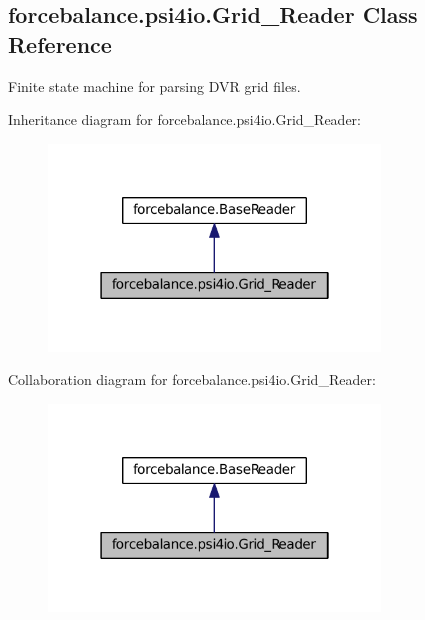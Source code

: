 \hypertarget{classforcebalance_1_1psi4io_1_1Grid__Reader}{\subsection{forcebalance.\-psi4io.\-Grid\-\_\-\-Reader \-Class \-Reference}
\label{classforcebalance_1_1psi4io_1_1Grid__Reader}
}


\-Finite state machine for parsing \-D\-V\-R grid files.  




\-Inheritance diagram for forcebalance.\-psi4io.\-Grid\-\_\-\-Reader\-:\nopagebreak
\begin{figure}[H]
\begin{center}
\leavevmode
\includegraphics[width=250pt]{classforcebalance_1_1psi4io_1_1Grid__Reader__inherit__graph}
\end{center}
\end{figure}


\-Collaboration diagram for forcebalance.\-psi4io.\-Grid\-\_\-\-Reader\-:\nopagebreak
\begin{figure}[H]
\begin{center}
\leavevmode
\includegraphics[width=250pt]{classforcebalance_1_1psi4io_1_1Grid__Reader__coll__graph}
\end{center}
\end{figure}
